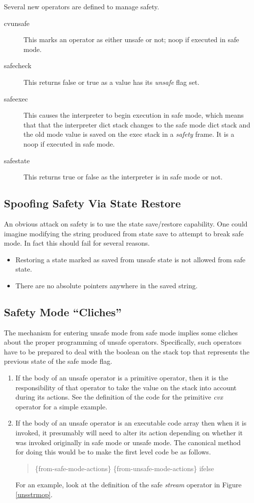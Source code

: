 \noindent Several new operators are defined to manage safety.
\begin{description}
\item[cvunsafe]
This marks an operator as either unsafe or not;
noop if executed in safe mode.
\item[safecheck]
This returns false or true as a value has its {\em unsafe} flag set.
\item[safeexec]
This causes the interpreter to begin execution in safe mode,
which means that that the interpreter dict stack changes to the
safe mode dict stack and the old mode value is saved on the exec
stack in a {\em safety} frame.
It is a noop if executed in safe mode.
\item[safestate]
This returns true or false as the interpreter is in safe mode or not.
\end{description}

\subsection{Spoofing Safety Via State Restore}
An obvious attack on safety is to use the state save/restore
capability.
One could imagine modifying the string produced from state save
to attempt to break safe mode.
In fact this should fail for several reasons.
\begin{itemize}
\item Restoring a state marked as saved from unsafe state
is not allowed from safe state.
\item There are no absolute pointers anywhere in the saved string.
\end{itemize}

\subsection{Safety Mode ``Cliches''}
The mechanism for entering unsafe mode from safe mode
implies some cliches about the proper programming
of unsafe operators.
Specifically, such operators have to be prepared to deal
with the boolean on the stack top that represents
the previous state of the safe mode flag.
\begin{enumerate}
\item If the body of an unsafe operator is a primitive operator,
      then it is the responsibility of that operator to
      take the value on the stack
      into account during its actions.
      See the definition of the code for the primitive {\em cvx} operator
      for a simple example.
\item If the body of an unsafe operator is an executable code
      array then when it is invoked, it presumably will need to
      alter its action depending on whether it was invoked originally
      in safe mode or unsafe mode.
      The canonical method for doing this would be to make the first
      level code be as follows.
      \begin{quote}
	\{from-safe-mode-actions\} \{from-unsafe-mode-actions\} ifelse
      \end{quote}
      For an example, look at the definition of the safe {\em stream}
      operator in Figure \ref{unsstrmop}.
\end{enumerate}

